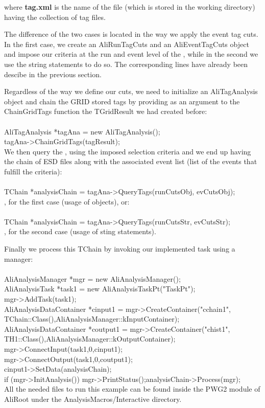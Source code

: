 \noindent where \textbf{tag.xml} is the name of the file (which is stored in the working directory) having the collection of tag files. 

The difference of the two cases is located in the way we apply the event tag cuts. In the first case, we create an {\ttfamily AliRunTagCuts} and an {\ttfamily AliEventTagCuts} object and impose our criteria at the run and event level of the \tag, while in the second we use the string statements to do so. The corresponding lines have already been descibe in the previous section. 


Regardless of the way we define our cuts, we need to initialize an {\ttfamily AliTagAnalysis} object and chain the GRID stored tags by providing as an argument to the {\ttfamily ChainGridTags} function the {\ttfamily TGridResult} we had created before:\\
\\
{\ttfamily AliTagAnalysis *tagAna = new AliTagAnalysis();}\\
{\ttfamily tagAna->ChainGridTags(tagResult);}\\

We then query the \tag, using the imposed selection criteria and we end up having the chain of ESD files along with the associated event list (list of the events that fulfill the criteria):\\
\\
{\ttfamily TChain *analysisChain = tagAna->QueryTags(runCutsObj, evCutsObj);}\\
\noindent, for the first case (usage of objects), or: \\
\\
{\ttfamily TChain *analysisChain = tagAna->QueryTags(runCutsStr, evCutsStr);}\\
\noindent, for the second case (usage of sting statements).

Finally we process this {\ttfamily TChain} by invoking our implemented task using a manager:\\
\\
{\ttfamily  AliAnalysisManager *mgr = new AliAnalysisManager();}\\
{\ttfamily  AliAnalysisTask *task1 = new AliAnalysisTaskPt("TaskPt");}\\
{\ttfamily  mgr->AddTask(task1);}\\
{\ttfamily  AliAnalysisDataContainer *cinput1 = mgr->CreateContainer("cchain1", TChain::Class(),AliAnalysisManager::kInputContainer);}\\
{\ttfamily  AliAnalysisDataContainer *coutput1 = mgr->CreateContainer("chist1", TH1::Class(),AliAnalysisManager::kOutputContainer);}\\
{\ttfamily  mgr->ConnectInput(task1,0,cinput1);}\\
{\ttfamily  mgr->ConnectOutput(task1,0,coutput1);}\\
{\ttfamily  cinput1->SetData(analysisChain);}\\  
{\ttfamily  if (mgr->InitAnalysis()) {mgr->PrintStatus();analysisChain->Process(mgr);}}\\

All the needed files to run this example can be found inside the PWG2 module of AliRoot under the AnalysisMacros/Interactive directory.

